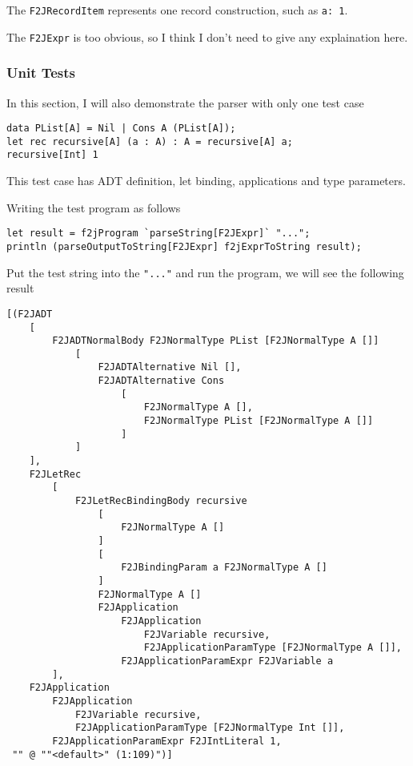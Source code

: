 The \texttt{F2JRecordItem} represents one record construction, such as \texttt{a: 1}.

The \texttt{F2JExpr} is too obvious, so I think I don't need to give any explaination here.

\subsubsection{Unit Tests}

In this section, I will also demonstrate the parser with only one test case

\begin{lstlisting}
data PList[A] = Nil | Cons A (PList[A]);
let rec recursive[A] (a : A) : A = recursive[A] a;
recursive[Int] 1
\end{lstlisting}

This test case has ADT definition, let binding, applications and type parameters.

Writing the test program as follows

\begin{lstlisting}
let result = f2jProgram `parseString[F2JExpr]` "...";
println (parseOutputToString[F2JExpr] f2jExprToString result);
\end{lstlisting}

Put the test string into the \texttt{"..."} and run the program, we will see the following result

\begin{lstlisting}
[(F2JADT
    [
        F2JADTNormalBody F2JNormalType PList [F2JNormalType A []]
            [
                F2JADTAlternative Nil [],
                F2JADTAlternative Cons
                    [
                        F2JNormalType A [],
                        F2JNormalType PList [F2JNormalType A []]
                    ]
            ]
    ],
    F2JLetRec
        [
            F2JLetRecBindingBody recursive
                [
                    F2JNormalType A []
                ]
                [
                    F2JBindingParam a F2JNormalType A []
                ]
                F2JNormalType A []
                F2JApplication
                    F2JApplication
                        F2JVariable recursive,
                        F2JApplicationParamType [F2JNormalType A []],
                    F2JApplicationParamExpr F2JVariable a
        ],
    F2JApplication
        F2JApplication
            F2JVariable recursive,
            F2JApplicationParamType [F2JNormalType Int []],
        F2JApplicationParamExpr F2JIntLiteral 1,
 "" @ ""<default>" (1:109)")]
\end{lstlisting}

